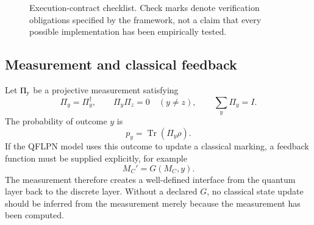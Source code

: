 \documentclass[final,3p,times]{elsarticle}
\begin{document}
\begin{figure}[tbp]
\centering
{}
\caption{Execution-contract checklist. Check marks denote verification obligations specified by the framework, not a claim that every possible implementation has been empirically tested.}
\label{fig:p1-execution-checklist}
\end{figure}


\subsection{Measurement and classical feedback}

Let $\\{\Pi_y\\}$ be a projective measurement satisfying
\begin{equation}
    \Pi_y=\Pi_y^\dagger,
    \qquad
    \Pi_y\Pi_z=0\quad(y\neq z),
    \qquad
    \sum_y\Pi_y=I.
\end{equation}
The probability of outcome $y$ is
\begin{equation}
    p_y=\operatorname{Tr}(\Pi_y\rho).
\end{equation}
If the QFLPN model uses this outcome to update a classical marking, a feedback function must be supplied explicitly, for example
\begin{equation}
    M_C'=G(M_C,y).
\end{equation}
The measurement therefore creates a well-defined interface from the quantum layer back to the discrete layer. Without a declared $G$, no classical state update should be inferred from the measurement merely because the measurement has been computed.
\end{document}
